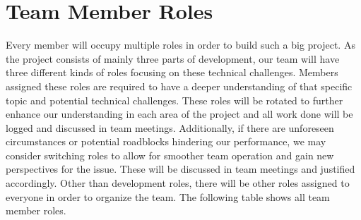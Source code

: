 \documentclass{article}
\begin{document}
\section{Team Member Roles}
\quad Every member will occupy multiple roles in order to build such a big project. As the project consists of mainly three parts of development, our team will have three different kinds of roles focusing on these technical challenges. Members assigned these roles are required to have a deeper understanding of that specific topic and potential technical challenges. These roles will be rotated to further enhance our understanding in each area of the project and all work done will be logged and discussed in team meetings. Additionally, if there are unforeseen circumstances or potential roadblocks hindering our performance, we may consider switching roles to allow for smoother team operation and gain new perspectives for the issue. These will be discussed in team meetings and justified accordingly. Other than development roles, there will be other roles assigned to everyone in order to organize the team. The following table shows all team member roles.
\end{document}
